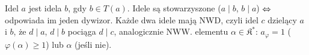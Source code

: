 Idel  $a$ jest  idela $b$, gdy $b \in T(a)$.
Idele są stowarzyszone ($a \mid b$, $b \mid a$) $\Leftrightarrow$ odpowiada im jeden dywizor.
Każde dwa idele mają NWD, czyli idel $c$ dzielący $a$ i $b$, że $d \mid a$, $d \mid b$ pociąga $d \mid c$, analogicznie NWW.
 elementu $\alpha \in \mathfrak K^*$: $a_\varphi = 1$ ($\varphi(\alpha) \ge 1$) lub $\alpha$ (jeśli nie).